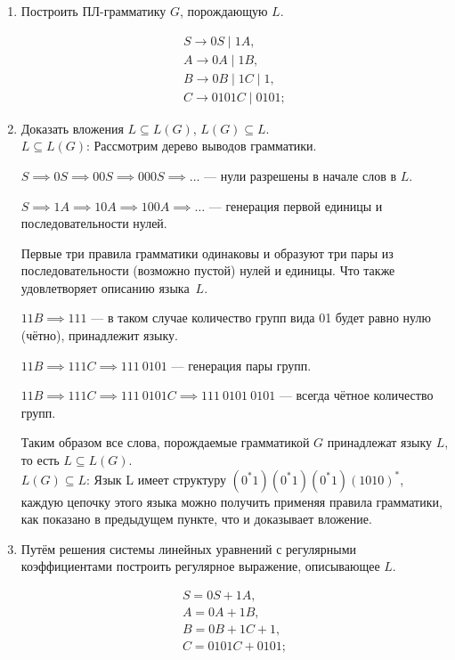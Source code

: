 \documentclass[fleqn,12pt, a4paper]{article}
\begin{document}
\begin{enumerate}[label=(\roman{*})]
	\item Построить ПЛ-грамматику $G$, порождающую $L$.
	
	\begin{equation}
		\begin{array}{l}
			S \to 0S \mid 1A, \\
			A \to 0A \mid 1B, \\
			B \to 0B \mid 1C \mid 1, \\
			C \to 0101C \mid 0101;
		\end{array}
	\end{equation}
	
	\item Доказать вложения $L \subseteq L(G)$, $L(G) \subseteq L$.\\
	
	\underline{$L \subseteq L(G)$}: Рассмотрим дерево выводов грамматики.
	
	$S \implies 0S \implies 00S \implies 000S \implies \dots$ --- нули разрешены в начале слов в $L$.
	
	$S \implies 1A \implies 10A \implies 100A \implies \dots$ --- генерация первой единицы и последовательности нулей.
	
	Первые три правила грамматики одинаковы и образуют три пары из последовательности (возможно пустой) нулей и единицы. Что также удовлетворяет описанию языка~$L$.
	
	$11B \implies 111 $ --- в таком случае количество групп вида 01 будет равно нулю (чётно), принадлежит языку.
	
	$11B \implies 111C \implies 111\ 0101$ --- генерация пары групп.
	
	$11B \implies 111C \implies 111\ 0101C \implies 111\ 0101\ 0101$ --- всегда чётное количество групп.
	
	Таким образом все слова, порождаемые грамматикой $G$ принадлежат языку $L$, то есть $L \subseteq L(G)$.\\
	
	
	\underline{$L(G) \subseteq L$}: Язык L имеет структуру $(0^*1)(0^*1)(0^*1)(1010)^*$, каждую цепочку этого языка можно получить применяя правила грамматики, как показано в предыдущем пункте, что и доказывает вложение.
	
	\item Путём решения системы линейных уравнений с регулярными коэффициентами построить регулярное выражение, описывающее $L$.
	
	
	\begin{equation}
		\begin{array}{l}
		S = 0S + 1A, \\
		A = 0A + 1B, \\
		B = 0B + 1C + 1, \\
		C = 0101C + 0101; \\\\
		

\end{array}
\end{equation}
\end{enumerate}
\end{document}
